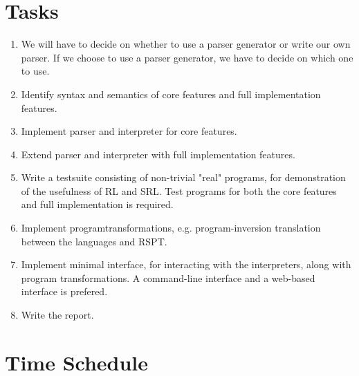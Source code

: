 \section{Tasks}
\label{sec:tasks}

\begin{enumerate}

  \item We will have to decide on whether to use a parser generator or write our own parser. If we choose to use a parser generator, we have to decide on which one to use.

  \item Identify syntax and semantics of core features and full implementation features.

  \item Implement parser and interpreter for core features.

  \item Extend parser and interpreter with full implementation features.

  \item Write a testsuite consisting of non-trivial "real" programs, for demonstration of the usefulness of RL and SRL. Test programs for both the core features and full implementation is required.

  \item Implement programtransformations, e.g. program-inversion translation between the languages and RSPT.

  \item Implement minimal interface, for interacting with the interpreters, along with program transformations. A command-line interface and a web-based interface is prefered.

  \item Write the report.

\end{enumerate}

\section{Time Schedule}
\label{sec:time_schedule}

